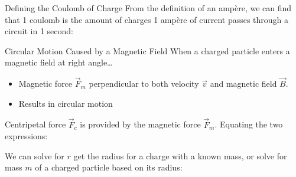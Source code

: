 \documentclass[12pt,aspectratio=169]{beamer}
\begin{document}



\begin{frame}{Defining the Coulomb of Charge}
  From the definition of an amp\`{e}re, we can find that 1 coulomb is the
  amount of charges 1 amp\`{e}re of current passes through a circuit in 1
  second:

\end{frame}



\begin{frame}{Circular Motion Caused by a Magnetic Field}
  When a charged particle enters a magnetic field at right angle\ldots
  \begin{itemize}
  \item Magnetic force $\vec F_m$ perpendicular to both velocity $\vec v$ and
    magnetic field $\vec B$.
  \item Results in circular motion
  \end{itemize}
  Centripetal force $\vec F_c$ is provided by the magnetic force $\vec F_m$.
  Equating the two expressions:

  
  We can solve for $r$ get the radius for a charge with a known
  mass, or solve for mass $m$ of a charged particle based on its radius:  

\end{frame}
\end{document}
